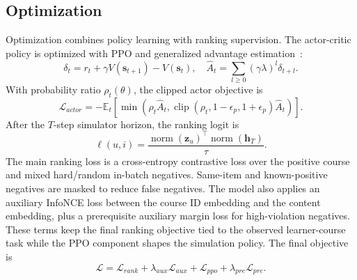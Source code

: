 \documentclass[sigconf,anonymous,review]{acmart}
\begin{document}
\subsection{Optimization}
Optimization combines policy learning with ranking supervision. The actor-critic policy is optimized with PPO and generalized advantage estimation~\cite{schulman2017ppo,schulman2015gae}:
\begin{equation}
\delta_t=r_t+\gamma V(\mathbf{s}_{t+1})-V(\mathbf{s}_t),
\quad
\hat{A}_t=\sum_{l\geq 0}(\gamma\lambda)^l\delta_{t+l}.
\end{equation}
With probability ratio \(\rho_t(\theta)\), the clipped actor objective is
\begin{equation}
\mathcal{L}_{actor}=
-\mathbb{E}_t\left[
\min(\rho_t\hat{A}_t,
\operatorname{clip}(\rho_t,1-\epsilon_p,1+\epsilon_p)\hat{A}_t)
\right].
\end{equation}
After the \(T\)-step simulator horizon, the ranking logit is
\begin{equation}
\ell(u,i)=\frac{\operatorname{norm}(\mathbf{z}_u)^\top
\operatorname{norm}(\mathbf{h}_T)}{\tau}.
\end{equation}
The main ranking loss is a cross-entropy contrastive loss over the positive course and mixed hard/random in-batch negatives. Same-item and known-positive negatives are masked to reduce false negatives. The model also applies an auxiliary InfoNCE loss between the course ID embedding and the content embedding, plus a prerequisite auxiliary margin loss for high-violation negatives. These terms keep the final ranking objective tied to the observed learner-course task while the PPO component shapes the simulation policy. The final objective is
\begin{equation}
\mathcal{L}=
\mathcal{L}_{rank}
+\lambda_{aux}\mathcal{L}_{aux}
+\mathcal{L}_{ppo}
+\lambda_{pre}\mathcal{L}_{pre}.
\end{equation}
\end{document}
